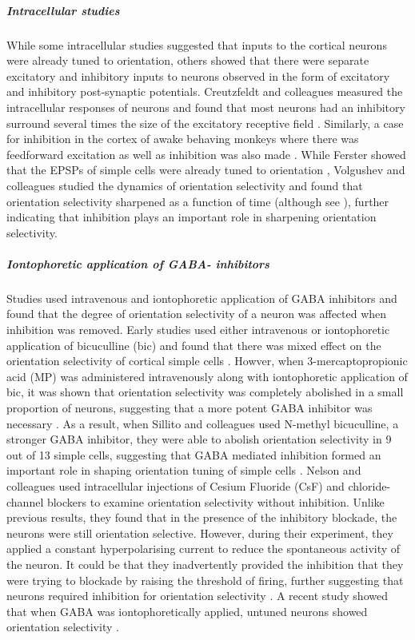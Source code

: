 \subparagraph{Intracellular studies}

While some intracellular studies suggested that inputs to the cortical neurons were already tuned to orientation, others showed that there were separate excitatory and inhibitory inputs to neurons observed in the form of excitatory and inhibitory post-synaptic potentials. Creutzfeldt and colleagues measured the intracellular responses of neurons and found that most neurons had an inhibitory surround several times the size of the excitatory receptive field \cite{Creutzfeldt1974}. Similarly, a case for inhibition in the cortex of awake behaving monkeys where there was feedforward excitation as well as inhibition was also made \cite{Celebrini1993}. While Ferster showed that the EPSPs of simple cells were already tuned to orientation \cite{Ferster1986}, Volgushev and colleagues studied the dynamics of orientation selectivity and found that orientation selectivity sharpened as a function of time \cite{Volgushev1995} (although see \cite{Celebrini1993}), further indicating that inhibition plays an important role in sharpening orientation selectivity.


\subparagraph{Iontophoretic application of GABA- inhibitors}

Studies used intravenous and iontophoretic application of GABA inhibitors and found that the degree of orientation selectivity of a neuron was affected when inhibition was removed. Early studies used either intravenous or iontophoretic application of bicuculline (bic) and found that there was mixed effect on the orientation selectivity of cortical simple cells \cite{Pettigrew1973, Sillito1975}. Howver, when 3-mercaptopropionic acid (MP) was administered intravenously along with iontophoretic application of bic, it was shown that orientation selectivity was completely abolished in a small proportion of neurons, suggesting that a more potent GABA inhibitor was necessary \cite{Tsumoto1979}. As a result, when Sillito and colleagues used N-methyl bicuculline, a stronger GABA inhibitor, they were able to abolish orientation selectivity in 9 out of 13 simple cells, suggesting that GABA mediated inhibition formed an important role in  shaping orientation tuning of simple cells \cite{Sillito1980}. Nelson and colleagues used intracellular injections of Cesium Fluoride (CsF) and chloride-channel blockers to examine orientation selectivity without inhibition. Unlike previous results, they found that in the presence of the inhibitory blockade, the neurons were still orientation selective. However, during their experiment, they applied a constant hyperpolarising current to reduce the spontaneous activity of the neuron. It could be that they inadvertently provided the inhibition that they were trying to blockade by raising the threshold of firing, further suggesting that neurons required inhibition for orientation selectivity \cite{Nelson1994}. A recent study showed that when GABA was iontophoretically applied, untuned neurons showed orientation selectivity \cite{Li2008}.

